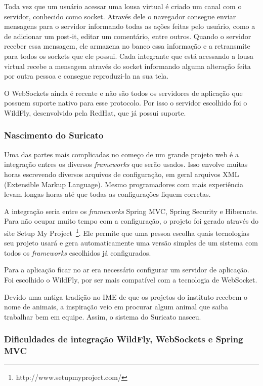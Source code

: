 Toda vez que um usuário acessar uma lousa virtual é criado um canal com o servidor, conhecido como socket. Através dele o navegador consegue enviar mensagens para o servidor informando todas as ações feitas pelo usuário, como a de adicionar um post-it, editar um comentário, entre outros. Quando o servidor receber essa mensagem, ele armazena no banco essa informação e a retransmite para todos os sockets que ele possui. Cada integrante que está acessando a lousa virtual recebe a mensagem através do socket informando alguma alteração feita por outra pessoa e consegue reproduzi-la na sua tela.

O WebSockets ainda é recente e não são todos os servidores de aplicação que possuem suporte nativo para esse protocolo. Por isso o servidor escolhido foi o WildFly, desenvolvido pela RedHat, que já possui suporte.

\subsubsection*{Nascimento do Suricato}

Uma das partes mais complicadas no começo de um grande projeto web é a integração entres os diversos \textit{frameworks} que serão usados. Isso envolve muitas horas escrevendo diversos arquivos de configuração, em geral arquivos XML (Extensible Markup Language). Mesmo programadores com mais experiência levam longas horas até que todas as configurações fiquem corretas. 

A integração seria entre os \textit{frameworks} Spring MVC, Spring Security e Hibernate. Para não ocupar muito tempo com a configuração, o projeto foi gerado através do site Setup My Project~\footnote{http://www.setupmyproject.com/}. Ele permite que uma pessoa escolha quais tecnologias seu projeto usará e gera automaticamente uma versão simples de um sistema com todos os \textit{frameworks} escolhidos já configurados.

Para a aplicação ficar no ar era necessário configurar um servidor de aplicação. Foi escolhido o WildFly, por ser mais compatível com a tecnologia de WebSocket.

Devido uma antiga tradição no IME de que os projetos do instituto recebem o nome de animais, a inspiração veio em procurar algum animal que saiba trabalhar bem em equipe. Assim, o sistema do Suricato nasceu.

\subsubsection*{Dificuldades de integração WildFly, WebSockets e Spring MVC}

